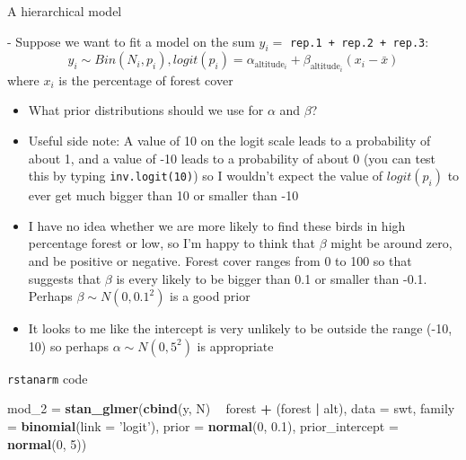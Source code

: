 \documentclass[ignorenonframetext,]{beamer}
\newenvironment{Shaded}{\begin{snugshade}}{\end{snugshade}}
\newcommand{\KeywordTok}[1]{\textcolor[rgb]{0.13,0.29,0.53}{\textbf{#1}}}
\newcommand{\DataTypeTok}[1]{\textcolor[rgb]{0.13,0.29,0.53}{#1}}
\newcommand{\DecValTok}[1]{\textcolor[rgb]{0.00,0.00,0.81}{#1}}
\newcommand{\FloatTok}[1]{\textcolor[rgb]{0.00,0.00,0.81}{#1}}
\newcommand{\StringTok}[1]{\textcolor[rgb]{0.31,0.60,0.02}{#1}}
\newcommand{\OperatorTok}[1]{\textcolor[rgb]{0.81,0.36,0.00}{\textbf{#1}}}
\newcommand{\NormalTok}[1]{#1}
\begin{document}
\begin{frame}[fragile]{A hierarchical model}

\small
- Suppose we want to fit a model on the sum \(y_i =\)
\texttt{rep.1\ +\ rep.2\ +\ rep.3}:
\[y_i \sim Bin(N_i, p_i), logit(p_i) = \alpha_{\mbox{altitude}_i} + \beta_{\mbox{altitude}_i} (x_i- \bar{x})\]
where \(x_i\) is the percentage of forest cover

\begin{itemize}
\item
  What prior distributions should we use for \(\alpha\) and \(\beta\)?
\item
  Useful side note: A value of 10 on the logit scale leads to a
  probability of about 1, and a value of -10 leads to a probability of
  about 0 (you can test this by typing \texttt{inv.logit(10)}) so I
  wouldn't expect the value of \(logit(p_i)\) to ever get much bigger
  than 10 or smaller than -10
\item
  I have no idea whether we are more likely to find these birds in high
  percentage forest or low, so I'm happy to think that \(\beta\) might
  be around zero, and be positive or negative. Forest cover ranges from
  0 to 100 so that suggests that \(\beta\) is every likely to be bigger
  than 0.1 or smaller than -0.1. Perhaps \(\beta \sim N(0, 0.1^2)\) is a
  good prior
\item
  It looks to me like the intercept is very unlikely to be outside the
  range (-10, 10) so perhaps \(\alpha \sim N(0, 5^2)\) is appropriate
\end{itemize}

\end{frame}

\begin{frame}[fragile]{\texttt{rstanarm} code}

\begin{Shaded}
\begin{Highlighting}[]
\NormalTok{mod_}\DecValTok{2}\NormalTok{ =}\StringTok{ }\KeywordTok{stan_glmer}\NormalTok{(}\KeywordTok{cbind}\NormalTok{(y, N) }\OperatorTok{~}\StringTok{ }\NormalTok{forest }\OperatorTok{+}\StringTok{ }\NormalTok{(forest }\OperatorTok{|}\StringTok{ }\NormalTok{alt),}
                  \DataTypeTok{data =}\NormalTok{ swt,}
                  \DataTypeTok{family =} \KeywordTok{binomial}\NormalTok{(}\DataTypeTok{link =} \StringTok{'logit'}\NormalTok{),}
                  \DataTypeTok{prior =} \KeywordTok{normal}\NormalTok{(}\DecValTok{0}\NormalTok{, }\FloatTok{0.1}\NormalTok{),}
                  \DataTypeTok{prior_intercept =} \KeywordTok{normal}\NormalTok{(}\DecValTok{0}\NormalTok{, }\DecValTok{5}\NormalTok{))}
\end{Highlighting}
\end{Shaded}

\end{frame}
\end{document}
